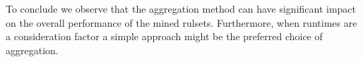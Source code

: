 \documentclass{article}
\theoremstyle{plain}
\theoremstyle{remark}
\begin{document}
To conclude we observe that the aggregation method can have significant impact on the overall performance of the mined rulsets. Furthermore, when runtimes are a consideration factor a simple approach might be the preferred choice of aggregation.




\begin{table}[h]
    \def\arraystretch{1.0}
    \centering
     \caption{Runtimes in minutes (m) our hours (h) with rules from AnyBURL.}
     \label{table:runtimes}
\end{table}
\end{document}
